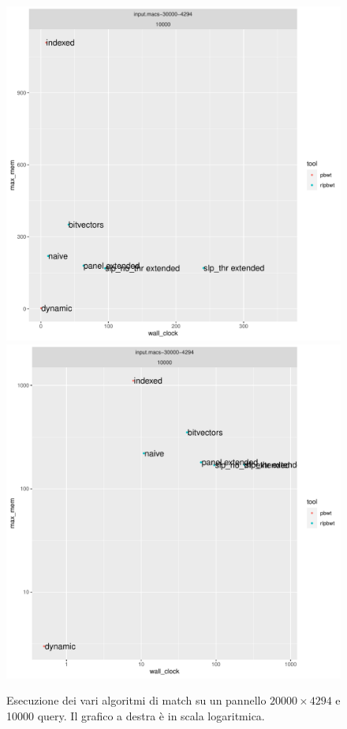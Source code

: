\begin{figure}
  \centering
  \includegraphics[scale = 0.35]{img/time_vs_mem_10000.pdf}
  \includegraphics[scale = 0.35]{img/time_vs_mem-loglog_10000.pdf}
  \caption{Esecuzione dei vari algoritmi di match su un pannello
    $20000\times 4294$ e 10000 query. Il grafico a destra è in scala
    logaritmica. }
  \label{fig:10000}
\end{figure}
